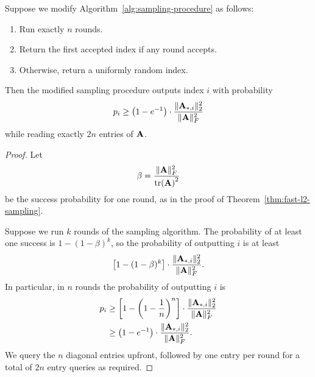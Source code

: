 \begin{corollary}
    Suppose we modify Algorithm~\ref{alg:sampling-procedure} as follows:
    \begin{enumerate}[
    label=\arabic*.,
    leftmargin=2em,
    itemsep=0.35em,
    topsep=0.45em,
    parsep=0pt
]
        \item Run exactly $n$ rounds.
        \item Return the first accepted index if any round accepts. 
        \item Otherwise, return a uniformly random index.
    \end{enumerate}
    Then the modified sampling procedure outputs index $i$ with probability 
    \[p_i\geq \left(1 - e^{-1}\right)\cdot\frac{\|\mathbf{A}_{*, i}\|^2_2}{\|\mathbf{A}\|^2_F}\]
    while reading exactly $2n$ entries of $\mathbf{A}$.
\end{corollary}

\begin{proof}
Let 
\[\beta = \frac{\|\mathbf{A}\|^2_F}{\tr(\mathbf{A})^2}\]
be the success probability for one round, as in the proof of Theorem~\ref{thm:fast-l2-sampling}.

Suppose we run $k$ rounds of the sampling algorithm. The probability of at least one success is 
$1 - (1-\beta)^k$,
so the probability of outputting $i$ is at least
\[\left[1 - (1-\beta)^k\right]\cdot \frac{\|\mathbf{A}_{*, i}\|^2_2}{\|\mathbf{A}\|^2_F}.\]
In particular, in $n$ rounds the probability of outputting $i$ is
\begin{align*}
    p_i&\geq \left[1 - \left(1-\frac{1}{n}\right)^n\right]\cdot \frac{\|\mathbf{A}_{*, i}\|^2_2}{\|\mathbf{A}\|^2_F}\\
    &\geq \left(1 - e^{-1}\right)\cdot \frac{\|\mathbf{A}_{*, i}\|^2_2}{\|\mathbf{A}\|^2_F}.
\end{align*}
We query the $n$ diagonal entries upfront, followed by one entry per round for a total of $2n$ entry queries as required.
\end{proof}




